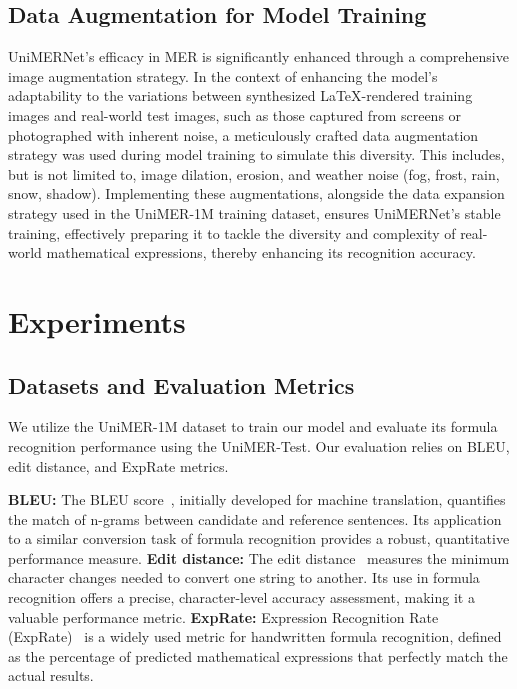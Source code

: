 \documentclass[runningheads]{llncs}
\begin{document}
\subsection{Data Augmentation for Model Training}
UniMERNet's efficacy in MER is significantly enhanced through a comprehensive image augmentation strategy. In the context of enhancing the model's adaptability to the variations between synthesized LaTeX-rendered training images and real-world test images, such as those captured from screens or photographed with inherent noise, a meticulously crafted data augmentation strategy was used during model training to simulate this diversity. This includes, but is not limited to, image dilation, erosion, and weather noise (fog, frost, rain, snow, shadow). Implementing these augmentations, alongside the data expansion strategy used in the UniMER-1M training dataset, ensures UniMERNet's stable training, effectively preparing it to tackle the diversity and complexity of real-world mathematical expressions, thereby enhancing its recognition accuracy.


\section{Experiments}

\subsection{Datasets and Evaluation Metrics} 

We utilize the UniMER-1M dataset to train our model and evaluate its formula recognition performance using the UniMER-Test. Our evaluation relies on BLEU, edit distance, and ExpRate metrics.

\textbf{BLEU:} The BLEU score~\cite{papineni2002bleu}, initially developed for machine translation, quantifies the match of n-grams between candidate and reference sentences. Its application to a similar conversion task of formula recognition provides a robust, quantitative performance measure.
\textbf{Edit distance:} The edit distance~\cite{levenshtein1966binary} measures the minimum character changes needed to convert one string to another. Its use in formula recognition offers a precise, character-level accuracy assessment, making it a valuable performance metric.
\textbf{ExpRate:} Expression Recognition Rate (ExpRate)~\cite{yuan2022syntax} is a widely used metric for handwritten formula recognition, defined as the percentage of predicted mathematical expressions that perfectly match the actual results.
\end{document}
